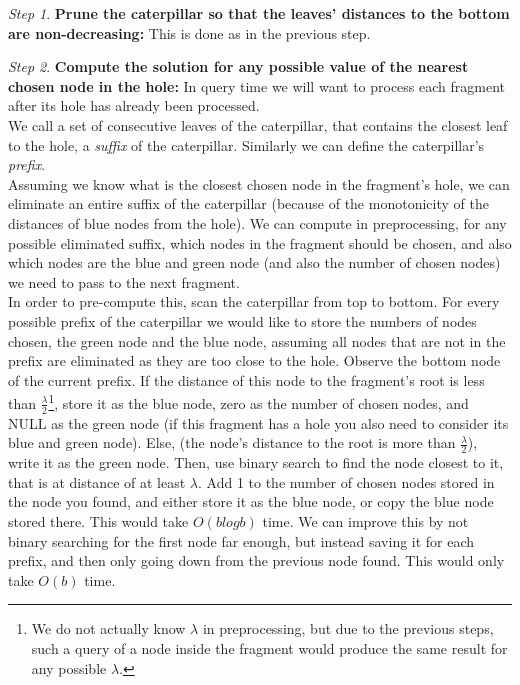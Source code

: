 \documentclass[11pt,a4paper]{article}
\theoremstyle{definition}
\theoremstyle{remark}
\newtheorem{step}{Step}[section]
\begin{document}
\begin{step}
\textbf{Prune the caterpillar so that the leaves' distances to the bottom are non-decreasing:}
This is done as in the previous step.
\end{step}
\begin{step}
\textbf{Compute the solution for any possible value of the nearest chosen node in the hole:}
In query time we will want to process each fragment after its hole has already been processed.\\
We call a set of consecutive leaves of the caterpillar, that contains the closest leaf to the hole, a \emph{suffix} of the caterpillar. Similarly we can define the caterpillar's \emph{prefix}.\\
Assuming we know what is the closest chosen node in the fragment's hole, we can eliminate an entire suffix of the caterpillar (because of the monotonicity of the distances of blue nodes from the hole). We can compute in preprocessing, for any possible eliminated suffix, which nodes in the fragment should be chosen, and also which nodes are the blue and green node (and also the number of chosen nodes) we need to pass to the next fragment.\\
In order to pre-compute this, scan the caterpillar from top to bottom. For every possible prefix of the caterpillar we would like to store the numbers of nodes chosen, the green node and the blue node, assuming all nodes that are not in the prefix are eliminated as they are too close to the hole. Observe the bottom node of the current prefix. If the distance of this node to the fragment's root is less than $\frac{\lambda}{2}$\footnote{We do not actually know $\lambda$ in preprocessing, but due to the previous steps, such a query of a node inside the fragment would produce the same result for any possible $\lambda$.}, store it as the blue node, zero as the number of chosen nodes, and NULL as the green node (if this fragment has a hole you also need to consider its blue and green node). Else, (the node's distance to the root is more than $\frac{\lambda}{2}$), write it as the green node. Then, use binary search to find the node closest to it, that is at distance of at least $\lambda$. Add 1 to the number of chosen nodes stored in the node you found, and either store it as the blue node, or copy the blue node stored there. This would take $O(blogb)$ time. We can improve this by not binary searching for the first node far enough, but instead saving it for each prefix, and then only going down from the previous node found. This would only take $O(b)$ time.
\end{step}
\end{document}
